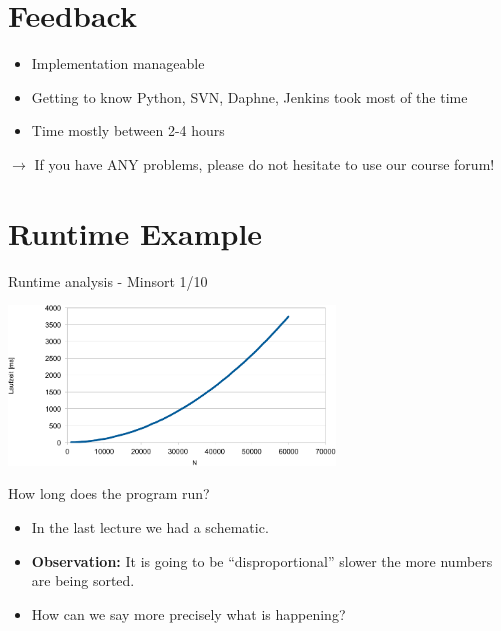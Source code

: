 \documentclass{beamer}
\def\LectureLanguage{eng}
\begin{document}
\begin{frame}
  \titlepage
\end{frame}

\begin{frame}{\LectureToC}
  \tableofcontents
\end{frame}

\section{Feedback}

\begin{frame}{\LectureFeedbackExercisesTitle}
  \begin{itemize}
  \item Implementation manageable
  \item Getting to know Python, SVN, Daphne, Jenkins took most of the time
  \item Time mostly between 2-4 hours
  \end{itemize}

  $\rightarrow$ If you have ANY problems, please do not hesitate to use our course forum!
\end{frame}


\section{Runtime Example}


\begin{frame}{Runtime analysis - Minsort 1/10}
  \begin{center}
    \includegraphics[width=0.65\textwidth]{Rolfs-Images/runtime-minsort.pdf}
  \end{center}
 How long does the program run?
 \begin{itemize}
    \item
      In the last lecture we had a schematic.
    \item
      \textbf{Observation:} It is going to be \enquote{disproportional} slower
      the more numbers are being sorted.
    \item
      How can we say more precisely what is happening?
  \end{itemize}
\end{frame}
\end{document}
